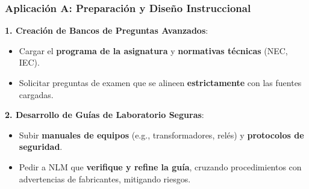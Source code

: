 \documentclass[aspectratio=43]{beamer}
\begin{document}





\begin{frame}
\frametitle{Aplicación A: Preparación y Diseño Instruccional}

\textbf{1. Creación de Bancos de Preguntas Avanzados}:
\begin{itemize}
    \item Cargar el \textbf{programa de la asignatura} y \textbf{normativas técnicas} (NEC, IEC).
    \item Solicitar preguntas de examen que se alineen \textbf{estrictamente} con las fuentes cargadas.
\end{itemize}

\textbf{2. Desarrollo de Guías de Laboratorio Seguras}:
\begin{itemize}
    \item Subir \textbf{manuales de equipos} (e.g., transformadores, relés) y \textbf{protocolos de seguridad}.
    \item Pedir a NLM que \textbf{verifique y refine la guía}, cruzando procedimientos con advertencias de fabricantes, mitigando riesgos.
\end{itemize}
\end{frame}
\end{document}
